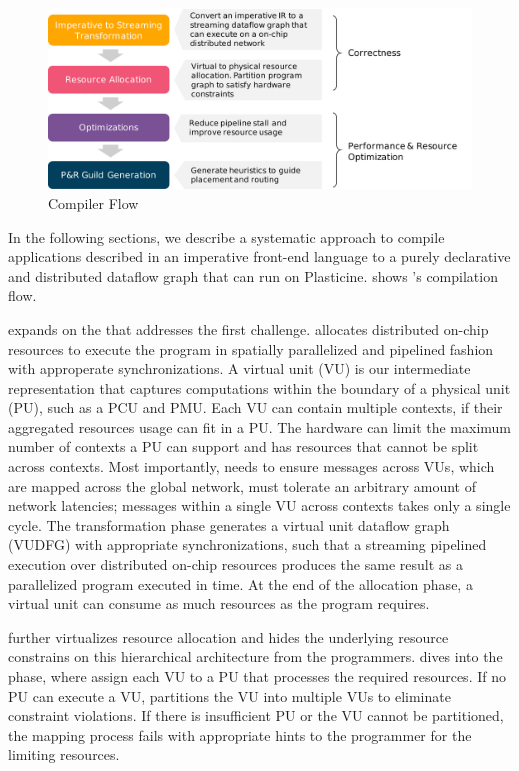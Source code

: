 \begin{figure}
\centering
\includegraphics[width=1\textwidth]{figs/sarastack.pdf}
\caption[\name Compiler Flow]{\name Compiler Flow}
\label{fig:flow}
\end{figure}
 
In the following sections, we describe a systematic approach to compile applications described in an
imperative front-end language to a purely declarative and distributed dataflow graph that can
run on Plasticine.  shows \name's compilation flow.

 expands on the  that
addresses the first challenge.
\name allocates distributed on-chip resources to execute the program in spatially parallelized and
pipelined fashion with approperate synchronizations.
A virtual unit (VU) is our intermediate representation that captures computations 
within the boundary of
a physical unit (PU), such as a PCU and PMU.
Each VU can contain multiple contexts, if their aggregated resources usage can fit in a PU.
The hardware can limit the maximum number of contexts a PU can support and has resources that cannot be split across contexts.
Most importantly, \name needs to ensure messages across VUs, which are mapped across the global network, must tolerate an arbitrary amount of network latencies; messages within a single VU across contexts takes only a single cycle.
The transformation phase generates a virtual unit dataflow graph (VUDFG) with appropriate
synchronizations, such that a streaming pipelined execution over distributed on-chip resources produces the same result as a
parallelized program executed in time.
At the end of the allocation phase, a virtual unit can consume as much resources as the program
requires. 

\name further virtualizes resource allocation and hides the underlying resource constrains on
this hierarchical architecture from the programmers.
 dives into the  phase, where \name assign each VU to a
PU that processes the required resources. If no PU can execute a VU, \name partitions the
VU into multiple VUs to eliminate constraint violations. If there is insufficient PU or the VU cannot be partitioned, the mapping process fails with appropriate hints to the programmer for the
limiting resources.

